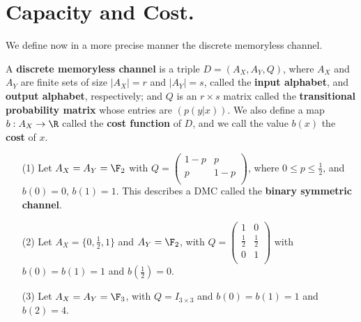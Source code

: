 
\section{Capacity and Cost.}
\label{section1}

We define now in a more precise manner the discrete memoryless channel.

\begin{definition}
    A \textbf{discrete memoryless channel} is a triple $D=(A_X,A_Y,Q)$, where
    $A_X$ and  $A_Y$ are finite sets of size  $|A_X|=r$ and  $|A_Y|=s$, called
    the \textbf{input alphabet}, and \textbf{output alphabet}, respectively; and
    $Q$ is an  $r \times s$ matrix called the  \textbf{transitional probability
    matrix} whose entries are $(p(y|x))$. We also define a map $b:A_X
    \rightarrow \R$ called the \textbf{cost function} of $D$, and we call the
    value  $b(x)$ the \textbf{cost} of $x$.
\end{definition}

\begin{example}
    \begin{enumerate}
        \item[(1)] Let $A_X=A_Y=\F_2$ with  $Q=\begin{pmatrix} 1-p & p \\ p
            & 1-p \\\end{pmatrix}$, where $0 \leq p \leq \frac{1}{2}$, and
            $b(0)=0$, $b(1)=1$. This describes a DMC called the \textbf{binary
            symmetric channel}.

        \item[(2)] Let $A_X=\{0, \frac{1}{2}, 1\}$ and $A_Y=\F_2$, with
                $Q=\begin{pmatrix} 1 & 0 \\ \frac{1}{2} & \frac{1}{2} \\ 0 &
                1 \\\end{pmatrix}$ with $b(0)=b(1)=1$ and $b(\frac{1}{2})=0$.

        \item[(3)] Let $A_X=A_Y=\F_3$, with  $Q=I_{3 \times 3}$ and
            $b(0)=b(1)=1$ and $b(2)=4$.
    \end{enumerate}
\end{example}

